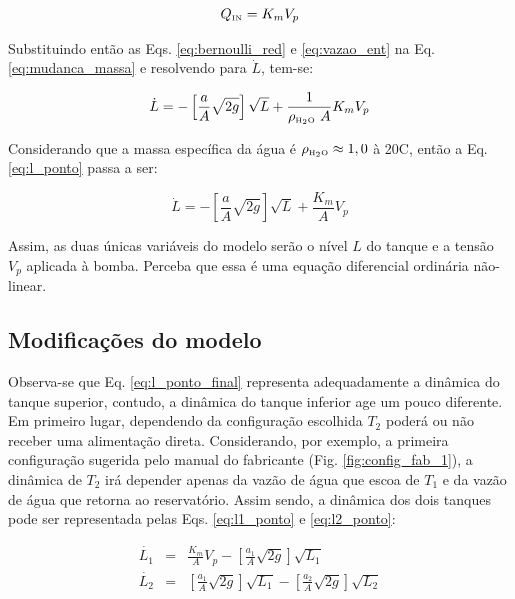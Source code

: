 \begin{equation}\label{eq:vazao_ent}
Q_{\text{\tiny IN}} = K_mV_p
\end{equation}

Substituindo então as Eqs. \ref{eq:bernoulli_red} e \ref{eq:vazao_ent} na Eq.
\ref{eq:mudanca_massa} e resolvendo para $\dot{L}$, tem-se:

\begin{equation}\label{eq:l_ponto}
\dot{L} = -\left[\frac{a}{A}\sqrt{2g}\right]\sqrt{L} + 
          \frac{1}{\rho_{\tiny \text{\tiny H}_2\text{\tiny O}}\ A}K_mV_p
\end{equation}

Considerando que a massa específica da água é $\rho_{\tiny \text{\tiny H}_2\text{\tiny O}} \approx 1,0$ à
20\textdegree C, então a Eq. \ref{eq:l_ponto} passa a ser:

\begin{equation}\label{eq:l_ponto_final}
\dot{L} = -\left[\frac{a}{A}\sqrt{2g}\right]\sqrt{L} + 
          \frac{K_m}{A}V_p
\end{equation}

Assim, as duas únicas variáveis do modelo serão o nível $L$ do tanque e a tensão
$V_p$ aplicada à bomba. Perceba que essa é uma equação diferencial ordinária
não-linear.

\subsection{Modificações do modelo}
Observa-se que Eq. \ref{eq:l_ponto_final} representa adequadamente a dinâmica do
tanque superior, contudo, a dinâmica do tanque inferior age um pouco diferente.
Em primeiro lugar, dependendo da configuração escolhida $T_2$ poderá ou não
receber uma alimentação direta. Considerando, por exemplo, a primeira
configuração sugerida pelo manual do fabricante (Fig. \ref{fig:config_fab_1}), a
dinâmica de $T_2$ irá depender apenas da vazão de água que escoa de $T_1$ e da
vazão de água que retorna ao reservatório. Assim sendo, a dinâmica dos dois
tanques pode ser representada pelas Eqs. \ref{eq:l1_ponto} e \ref{eq:l2_ponto}:

\begin{eqnarray}
\dot{L_1} & = & \frac{K_m}{A}V_p -
                \left[\frac{a_1}{A}\sqrt{2g}\right]\sqrt{L_1}
                \label{eq:l1_ponto}\\
\dot{L_2} & = & \left[\frac{a_1}{A}\sqrt{2g}\right]\sqrt{L_1} -
                \left[\frac{a_2}{A}\sqrt{2g}\right]\sqrt{L_2}
                \label{eq:l2_ponto}
\end{eqnarray}

